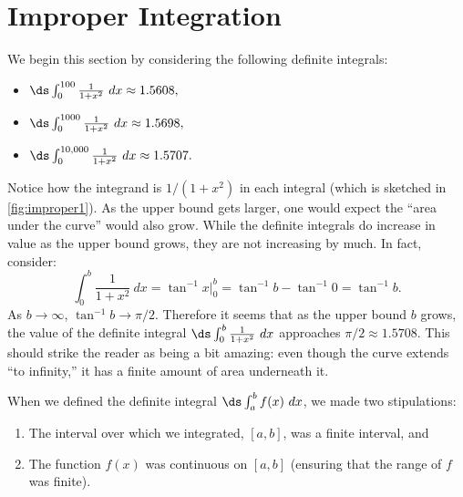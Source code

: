 \section{Improper Integration}\label{sec:improper_integration}

We begin this section by considering the following definite integrals:
\begin{itemize}
\item	$\ds \int_0^{100}\frac1{1+x^2}\ dx \approx 1.5608,$
\item	$\ds \int_0^{1000}\frac1{1+x^2}\ dx \approx 1.5698,$
\item	$\ds \int_0^{10,000}\frac1{1+x^2}\ dx \approx 1.5707.$
\end{itemize}

Notice how the integrand is $1/(1+x^2)$ in each integral (which is sketched in \autoref{fig:improper1}). As the upper bound gets larger, one would expect the ``area under the curve'' would also grow. While the definite integrals do increase in value as the upper bound grows, they are not  increasing by much. In fact, consider:
\[\int_0^b \frac{1}{1+x^2}\ dx = \tan^{-1}x\Big|_0^b = \tan^{-1}b-\tan^{-1}0 = \tan^{-1}b.\]
As $b\rightarrow \infty$, $\tan^{-1}b \rightarrow \pi/2.$ Therefore it seems that as the upper bound $b$ grows, the value of the definite integral $\ds \int_0^b\frac{1}{1+x^2}\ dx$ approaches $\pi/2\approx 1.5708$. This should strike the reader as being a bit amazing: even though the curve extends ``to infinity,'' it has a finite amount of area underneath it.


When we defined the definite integral $\ds\int_a^b f(x)\ dx$, we made two stipulations:
	\begin{enumerate}
	\item		The interval over which we integrated, $[a,b]$, was a finite interval, and
	\item		The function $f(x)$ was continuous on $[a,b]$ (ensuring that the range of $f$ was finite).
	\end{enumerate}
	
